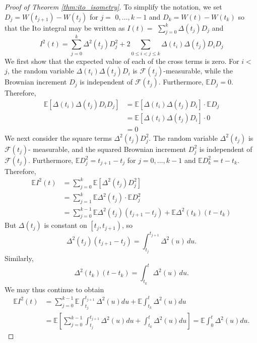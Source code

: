 \documentclass[\topdir/lecture\_notes.tex]{subfiles}
\begin{document}
\begin{optional}
\begin{proof}[Proof of Theorem \ref{thm:ito_isometry}]
To simplify the notation, we set $D_{j}=W\left(t_{j+1}\right)-W\left(t_{j}\right)$ for $j=$ $0, \ldots, k-1$ and $D_{k}=W(t)-W\left(t_{k}\right)$ so that the Ito integral may be written as $I(t)=$ $\sum_{j=0}^{k} \Delta\left(t_{j}\right) D_{j}$ and
\begin{equation*}
I^{2}(t)=\sum_{j=0}^{k} \Delta^{2}\left(t_{j}\right) D_{j}^{2}+2 \sum_{0 \leq i<j \leq k} \Delta\left(t_{i}\right) \Delta\left(t_{j}\right) D_{i} D_{j}
\end{equation*}
We first show that the expected value of each of the cross terms is zero. For $i<$ $j$, the random variable $\Delta\left(t_{i}\right) \Delta\left(t_{j}\right) D_{i}$ is $\mathcal{F}\left(t_{j}\right)$-measurable, while the Brownian increment $D_{j}$ is independent of $\mathcal{F}\left(t_{j}\right)$. Furthermore, $\mathbb{E} D_{j}=0$. Therefore,
\begin{align*}
\mathbb{E}\left[\Delta\left(t_{i}\right) \Delta\left(t_{j}\right) D_{i} D_{j}\right]&=\mathbb{E}\left[\Delta\left(t_{i}\right) \Delta\left(t_{j}\right) D_{i}\right] \cdot \mathbb{E} D_{j}\\
&=\mathbb{E}\left[\Delta\left(t_{i}\right) \Delta\left(t_{j}\right) D_{i}\right] \cdot 0\\
&=0
\end{align*}
We next consider the square terms $\Delta^{2}\left(t_{j}\right) D_{j}^{2}$. The random variable $\Delta^{2}\left(t_{j}\right)$ is $\mathcal{F}\left(t_{j}\right)$- measurable, and the squared Brownian increment $D_{j}^{2}$ is independent of $\mathcal{F}\left(t_{j}\right)$. Furthermore, $\mathbb{E} D_{j}^{2}=t_{j+1}-t_{j}$ for $j=0, \ldots, k-1$ and $\mathbb{E} D_{k}^{2}=t-t_{k}$. Therefore,
\begin{align}
\mathbb{E} I^{2}(t) & =\sum_{j=0}^{k} \mathbb{E}\left[\Delta^{2}\left(t_{j}\right) D_{j}^{2}\right]\\
&=\sum_{j=1}^{k} \mathbb{E} \Delta^{2}\left(t_{j}\right) \cdot \mathbb{E} D_{j}^{2} \\
& =\sum_{j=0}^{k-1} \mathbb{E} \Delta^{2}\left(t_{j}\right)\left(t_{j+1}-t_{j}\right)+\mathbb{E} \Delta^{2}\left(t_{k}\right)\left(t-t_{k}\right)
\label{4.2.7}
\end{align}
But $\Delta\left(t_{j}\right)$ is constant on $\left[t_{j}, t_{j+1}\right)$, so
\[
\Delta^{2}(t_{j})(t_{j+1}-t_{j})=\int_{t_{j}}^{t_{j+1}} \Delta^{2}(u)\, d u.
\]
Similarly,
\[
\Delta^{2}(t_{k})(t-t_{k})=\int_{t_{k}}^{t} \Delta^{2}(u)\, d u.
\]
We may thus continue to obtain
\begin{align*}
\mathbb{E} I^{2}(t) & =\sum_{j=0}^{k-1} \mathbb{E} \int_{t_{j}}^{t_{j+1}} \Delta^{2}(u) d u+\mathbb{E} \int_{t_{k}}^{t} \Delta^{2}(u) d u \\
& =\mathbb{E}\left[\sum_{j=0}^{k-1} \int_{t_{j}}^{t_{j+1}} \Delta^{2}(u) d u+\int_{t_{k}}^{t} \Delta^{2}(u) d u\right]=\mathbb{E} \int_{0}^{t} \Delta^{2}(u) du.
\end{align*}
\end{proof}


\end{optional}
\end{document}
